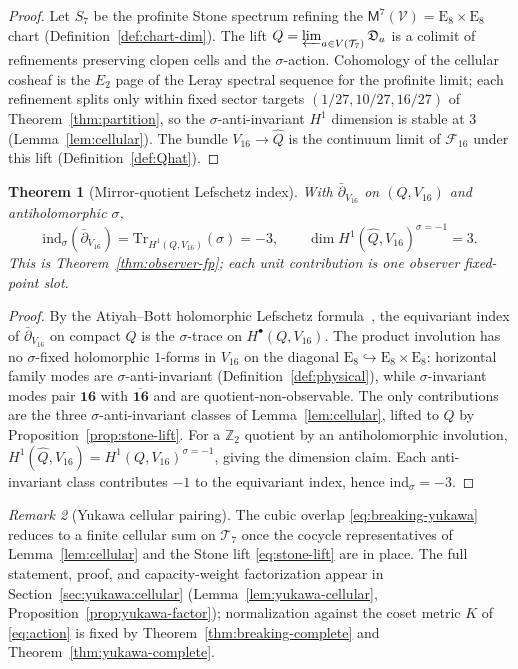 \documentclass[11pt]{article}
\theoremstyle{plain}
\newtheorem{theorem}{Theorem}[section]
\theoremstyle{definition}
\theoremstyle{remark}
\newtheorem{remark}[theorem]{Remark}
\numberwithin{equation}{section}
\newcommand{\E}[1]{\mathrm{E}_{#1}}
\newcommand{\Void}{\mathcal{V}}
\newcommand{\Mirror}{\mathsf{M}}
\begin{document}
\begin{proof}
Let $S_7$ be the profinite Stone spectrum refining the
$\Mirror^7(\Void)=\E{8}\times\E{8}$ chart
(Definition~\ref{def:chart-dim}). The lift $Q=\varprojlim_{a\in V(\mathcal{T}_7)}\mathfrak{D}_a$
is a colimit of refinements preserving clopen cells and the $\sigma$-action.
Cohomology of the cellular cosheaf is the $E_2$ page of the Leray spectral
sequence for the profinite limit; each refinement splits only within fixed
sector targets $(1/27,10/27,16/27)$ of Theorem~\ref{thm:partition}, so the
$\sigma$-anti-invariant $H^1$ dimension is stable at $3$
(Lemma~\ref{lem:cellular}). The bundle $V_{16}\to\hat Q$ is the continuum
limit of $\mathcal{F}_{16}$ under this lift
(Definition~\ref{def:Qhat}).
\end{proof}

\begin{theorem}[Mirror-quotient Lefschetz index]\label{thm:mirror-index}
With $\bar\partial_{V_{16}}$ on $(Q,V_{16})$ and antiholomorphic $\sigma$,
\begin{equation}\label{eq:mirror-index}
  \mathrm{ind}_\sigma(\bar\partial_{V_{16}})
  =\mathrm{Tr}_{H^1(Q,V_{16})}(\sigma)=-3,
  \qquad
  \dim H^1(\hat Q,V_{16})^{\sigma=-1}=3.
\end{equation}
This is Theorem~\ref{thm:observer-fp}; each unit contribution is one observer
fixed-point slot.
\end{theorem}

\begin{proof}
By the Atiyah--Bott holomorphic Lefschetz formula~\cite{AtiyahBott1966}, the
equivariant index of $\bar\partial_{V_{16}}$ on compact $Q$ is the
$\sigma$-trace on $H^\bullet(Q,V_{16})$. The product involution has no
$\sigma$-fixed holomorphic $1$-forms in $V_{16}$ on the diagonal
$\E{8}\hookrightarrow\E{8}\times\E{8}$: horizontal family modes are
$\sigma$-anti-invariant (Definition~\ref{def:physical}), while $\sigma$-invariant
modes pair $\mathbf{16}$ with $\overline{\mathbf{16}}$ and are
quotient-non-observable. The only contributions are the three
$\sigma$-anti-invariant classes of Lemma~\ref{lem:cellular}, lifted to $Q$ by
Proposition~\ref{prop:stone-lift}. For a $\mathbb{Z}_2$ quotient by an
antiholomorphic involution,
$H^1(\hat Q,V_{16})=H^1(Q,V_{16})^{\sigma=-1}$, giving the dimension claim.
Each anti-invariant class contributes $-1$ to the equivariant index, hence
$\mathrm{ind}_\sigma=-3$.
\end{proof}

\begin{remark}[Yukawa cellular pairing]
The cubic overlap \eqref{eq:breaking-yukawa} reduces to a finite cellular sum
on $\mathcal{T}_7$ once the cocycle representatives of Lemma~\ref{lem:cellular}
and the Stone lift \eqref{eq:stone-lift} are in place. The full statement,
proof, and capacity-weight factorization appear in
Section~\ref{sec:yukawa:cellular} (Lemma~\ref{lem:yukawa-cellular},
Proposition~\ref{prop:yukawa-factor}); normalization against the coset metric
$K$ of \eqref{eq:action} is fixed by Theorem~\ref{thm:breaking-complete}
and Theorem~\ref{thm:yukawa-complete}.
\end{remark}
\end{document}
